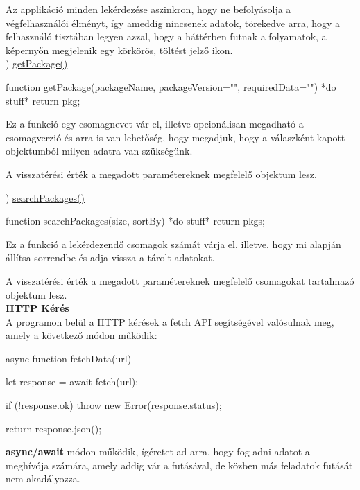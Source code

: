 Az applikáció minden lekérdezése aszinkron, hogy ne befolyásolja a végfelhasználói élményt, így ameddig nincsenek adatok, törekedve arra, hogy a felhasználó tisztában legyen azzal, hogy a háttérben futnak a folyamatok, a képernyőn megjelenik egy körkörös, töltést jelző ikon.\\

) \underline{getPackage()}\\

\begin{cpp}
function getPackage(packageName, packageVersion="", requiredData=""){
	*do stuff*
	return pkg;
}
\end{cpp}

Ez a funkció egy csomagnevet vár el, illetve opcionálisan megadható a csomagverzió és arra is van lehetőség, hogy megadjuk, hogy a válaszként kapott objektumból milyen adatra van szükségünk.

A visszatérési érték a megadott paramétereknek megfelelő objektum lesz.

\pagebreak

) \underline{searchPackages()}\\

\begin{cpp}
	function searchPackages(size, sortBy){
		*do stuff*
		return pkgs;
	}
\end{cpp}

Ez a funkció a lekérdezendő csomagok számát várja el, illetve, hogy mi alapján állítsa sorrendbe és adja vissza a tárolt adatokat.

A visszatérési érték a megadott paramétereknek megfelelő csomagokat tartalmazó objektum lesz.\\

\noindent\textbf{HTTP Kérés}\\

A programon belül a HTTP kérések a fetch API segítségével valósulnak meg, amely a következő módon működik:

\begin{cpp}
async function fetchData(url){
	let response = await fetch(url);
	
	if (!response.ok) {
		throw new Error(response.status);
	}
	
	return response.json();
}
\end{cpp}

\textbf{async/await} módon működik, ígéretet ad arra, hogy fog adni adatot a meghívója számára, amely addig vár a futásával, de közben más feladatok futását nem akadályozza.\\


